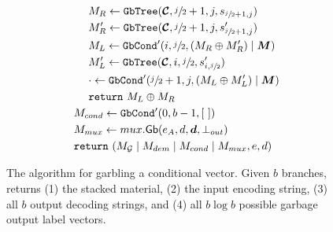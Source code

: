 \begin{figure}
\begin{align*}
    &~~~~~~\mat_R \gets \gbtree(\vec{\cir}, \sfrac{j}{2}+1, j, s_{\sfrac{j}{2}+1, j})\\
    &~~~~~~\mat_R' \gets \gbtree(\vec{\cir}, \sfrac{j}{2}+1, j, s'_{\sfrac{j}{2}+1, j})\\
    &~~~~~~\mat_L \gets \gbcond'(i, \sfrac{j}{2}, (\mat_R \oplus \mat_R') \mid \vec{\mat})\\
    &~~~~~~\mat_L' \gets \gbtree(\vec{\cir}, i, \sfrac{j}{2}, s'_{i, \sfrac{j}{2}})\\
    &~~~~~~\cdot \gets \gbcond'(\sfrac{j}{2}+1, j, (\mat_L \oplus \mat_L') \mid \vec{\mat})\\
    &~~~~~~\creturn~\mat_L \oplus \mat_R\\
    &~~\mat_{cond} \gets \gbcond'(0, b-1, [~])\\
    &~~\mat_{mux} \gets \gbmux(e_\aid, d, \vec{d}, \bot_{out})\\
    &~~\creturn~(\mat_\gadget \mid \mat_{dem} \mid \mat_{cond} \mid \mat_{mux}, e, d)
  \end{align*}
  \caption{%
    The algorithm for garbling a conditional vector.
    Given $b$ branches, \gbcond returns (1) the stacked material, (2)
    the input encoding string, (3) all $b$ output decoding strings,
    and (4) all $b\log b$ possible garbage output label vectors.
  }
\end{figure}
